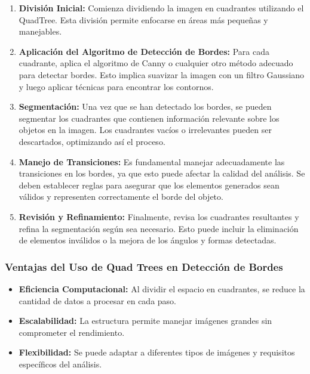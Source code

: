 \documentclass[9pt,a4paper,twoside]{rho-class/rho}
\begin{document}
            \begin{enumerate}
                \item \textbf{División Inicial:} Comienza dividiendo la imagen en cuadrantes utilizando el QuadTree. Esta división permite enfocarse en áreas más pequeñas y manejables.
                
                \item \textbf{Aplicación del Algoritmo de Detección de Bordes:} Para cada cuadrante, aplica el algoritmo de Canny o cualquier otro método adecuado para detectar bordes. Esto implica suavizar la imagen con un filtro Gaussiano y luego aplicar técnicas para encontrar los contornos.
                
                \item \textbf{Segmentación:} Una vez que se han detectado los bordes, se pueden segmentar los cuadrantes que contienen información relevante sobre los objetos en la imagen. Los cuadrantes vacíos o irrelevantes pueden ser descartados, optimizando así el proceso.
                
                \item \textbf{Manejo de Transiciones:} Es fundamental manejar adecuadamente las transiciones en los bordes, ya que esto puede afectar la calidad del análisis. Se deben establecer reglas para asegurar que los elementos generados sean válidos y representen correctamente el borde del objeto.
                
                \item \textbf{Revisión y Refinamiento:} Finalmente, revisa los cuadrantes resultantes y refina la segmentación según sea necesario. Esto puede incluir la eliminación de elementos inválidos o la mejora de los ángulos y formas detectadas.
            \end{enumerate}
            
            \subsubsection{Ventajas del Uso de Quad Trees en Detección de Bordes}
            
            \begin{itemize}
                \item \textbf{Eficiencia Computacional:} Al dividir el espacio en cuadrantes, se reduce la cantidad de datos a procesar en cada paso.
                
                \item \textbf{Escalabilidad:} La estructura permite manejar imágenes grandes sin comprometer el rendimiento.
                
                \item \textbf{Flexibilidad:} Se puede adaptar a diferentes tipos de imágenes y requisitos específicos del análisis.
            \end{itemize}
            
\end{document}
